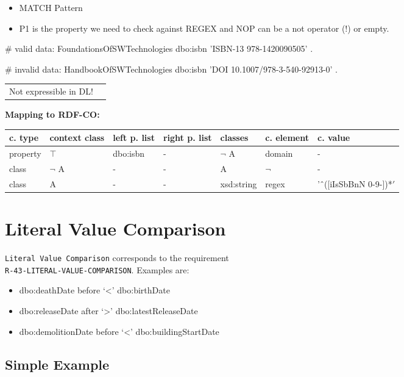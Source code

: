 \documentclass{llncs}
\newcommand{\ms}[1]{\texttt{#1}}
\newenvironment{gcotable}{
  \scriptsize
  \sffamily
  \vspace{0cm}
	\begin{center}
	\textbf{\vspace{0.4cm}Mapping to RDF-CO:} \\
  \begin{tabular}{l|l|l|l|l|l|l}
	\hline
  \textbf{c. type} & \textbf{context class} & \textbf{left p. list} & \textbf{right p. list} & \textbf{classes} & \textbf{c. element} & \textbf{c. value} \\
  \hline

}{
  \hline
  \end{tabular}
	\end{center}
}
\newenvironment{DL}{
  \vspace{0cm}
	\begin{center}
  \begin{tabular}{r l}

}{
  \end{tabular}
	\end{center}
}
\begin{document}

\begin{itemize}
	\item MATCH Pattern \cite{Kontokostas2014} 
  \item P1 is the property we need to check against REGEX and
NOP can be a not operator (!) or empty.
\end{itemize}

\begin{ex}
# valid data:
FoundationsOfSWTechnologies
    dbo:isbn 'ISBN-13 978-1420090505' .
\end{ex}

\begin{ex}
# invalid data:
HandbookOfSWTechnologies
    dbo:isbn 'DOI 10.1007/978-3-540-92913-0' .
\end{ex}

\begin{DL}
Not expressible in DL!
\end{DL}

\begin{gcotable}
property & $\top$ & dbo:isbn & - & $\neg$ A & domain & - \\
class & $\neg$ A & - & - & A & $\neg$ & - \\
class & A & - & - & xsd:string & regex & 'ˆ([iIsSbBnN 0-9-])*$' $ \\
\end{gcotable}

\section{Literal Value Comparison}

\ms{Literal Value Comparison} corresponds to the requirement \\
\ms{R-43-LITERAL-VALUE-COMPARISON}.
Examples are:

\begin{itemize}
	\item dbo:deathDate before ‘\textless’ dbo:birthDate
  \item dbo:releaseDate after ‘\textgreater’ dbo:latestReleaseDate
  \item dbo:demolitionDate before ‘\textless’ dbo:buildingStartDate
\end{itemize}

\subsection{Simple Example}
\end{document}

